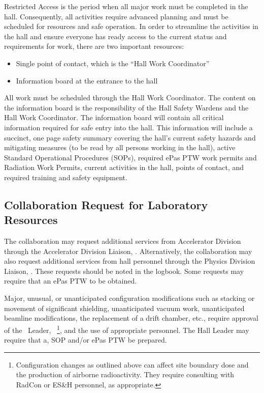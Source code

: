 \documentclass[11pt]{article}
\begin{document}
Restricted Access is the period when all major work must be completed in the
hall. Consequently, all activities require advanced planning and must be 
scheduled for resources and safe operation. In order to streamline the 
activities in the hall and ensure everyone
has ready access to the current status and requirements for work, there
are two important resources: 
\begin{itemize} 
\item Single point of contact, which is the ``Hall Work Coordinator''
\item Information board at the entrance to the hall
\end{itemize}
All work must be scheduled through the Hall Work Coordinator. The content 
on the information board is the responsibility of the Hall Safety Wardens 
and the Hall Work Coordinator. The information board will contain all critical 
information required for safe entry into the hall. This information will
include a succinct, one page safety summary covering the hall's current
safety hazards and mitigating measures (to be read by all persons working
in the hall), active Standard Operational Procedures (SOPs), 
required ePas PTW work permits and Radiation Work Permits, current activities in the hall, points of 
contact, and required training and safety equipment.


\subsection{Collaboration Request for Laboratory Resources}
\indent

The collaboration may request additional services from Accelerator
Division through the Accelerator Division Liaison, \ACCDIVLIAISON.  Alternatively,
the collaboration may also request additional services from hall personnel 
through the Physics Division Liaison, \PHYSDIVLIAISON. These requests 
should be noted in the logbook. Some requests may require that an
ePas PTW to be obtained.

Major, unusual, or unanticipated configuration modifications such as stacking 
or movement of significant shielding, unanticipated vacuum work, unanticipated
beamline modifications, the replacement of a drift chamber, etc., require 
approval of the \HALL\ Leader, \HALLLEADER\ 
\footnote{\label{fn1}Configuration changes as outlined above can affect site
boundary dose and the production of airborne radioactivity. They require
consulting with RadCon or ES\&H personnel, as appropriate.}, and the use of 
appropriate personnel. The Hall Leader may require that a, SOP and/or  ePas PTW 
be prepared.
\end{document}
